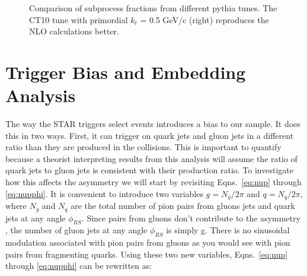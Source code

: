 \documentclass[letterpaper, abstract = on,listof=totoc, bibliography=totoc]{scrreprt}
\newcommand{\phirs}{\phi_{RS}}
\begin{document}
\begin{appendices}
\begin{figure}
\caption[Comparison of subprocess fractions from different pythia tunes]{Comparison of subprocess fractions from different pythia tunes. The CT10 tune with primordial $k_t$ = 0.5 GeV/c (right) reproduces the NLO calculations better.}
\label{fig:jetSubprocessFractions}
\end{figure}

%
%

\chapter{Trigger Bias and Embedding Analysis}
\label{ch:trigBias}

The way the STAR triggers select events introduces a bias to our sample. It does this in two ways. First, it can trigger on quark jets and gluon jets in a different ratio than they are produced in the collisions. This is important to quantify because a theorist interpreting results from this analysis will assume the ratio of quark jets to gluon jets is consistent with their production ratio. To investigate how this affects the asymmetry we will start by revisiting Eqns.~\ref{eq:nup} through \ref{eq:nupphi}. It is convenient to introduce two variables $g = N_g/2\pi$ and $q = N_q/2\pi$, where $N_g$ and $N_q$ are the total number of pion pairs from gluons jets and quark jets at any angle $\phirs$. Since pairs from gluons don't contribute to the asymmetry \cite{Jaffe:spinProc, bacchettaRadici2}, the number of gluon jets at any angle $\phirs$ is simply g. There is no sinusoidal modulation associated with pion pairs from gluons as you would see with pion pairs from fragmenting quarks. Using these two new variables, Eqns.~\ref{eq:nup} through \ref{eq:nupphi} can be rewritten as:


\end{appendices}
\end{document}
